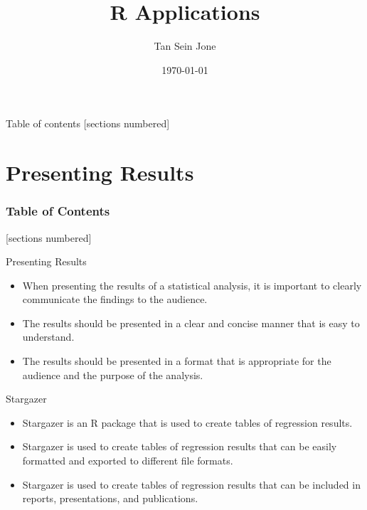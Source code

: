 \documentclass[serif, 9pt, aspectratio=32]{beamer}
\title{R Applications}
\date{\today}
\author{Tan Sein Jone}
\institute{University of British Columbia}
\begin{document}
\maketitle

\begin{frame}{Table of contents}
    [sections numbered]
    \tableofcontents[hideallsubsections]
\end{frame}

\section{Presenting Results}

\begin{frame}
    \frametitle{Table of Contents}
    [sections numbered]
    \tableofcontents[currentsection]
\end{frame}

\begin{frame}{Presenting Results}
    \begin{itemize}
        \setlength{\itemsep}{2em}
        \item When presenting the results of a statistical analysis, it is important to clearly communicate the findings to the audience.
        \item The results should be presented in a clear and concise manner that is easy to understand.
        \item The results should be presented in a format that is appropriate for the audience and the purpose of the analysis.
    \end{itemize}
\end{frame}

\begin{frame}{Stargazer}
    \begin{itemize}
        \setlength{\itemsep}{2em}
        \item Stargazer is an R package that is used to create tables of regression results.
        \item Stargazer is used to create tables of regression results that can be easily formatted and exported to different file formats.
        \item Stargazer is used to create tables of regression results that can be included in reports, presentations, and publications.
    \end{itemize}
\end{frame}
\end{document}

